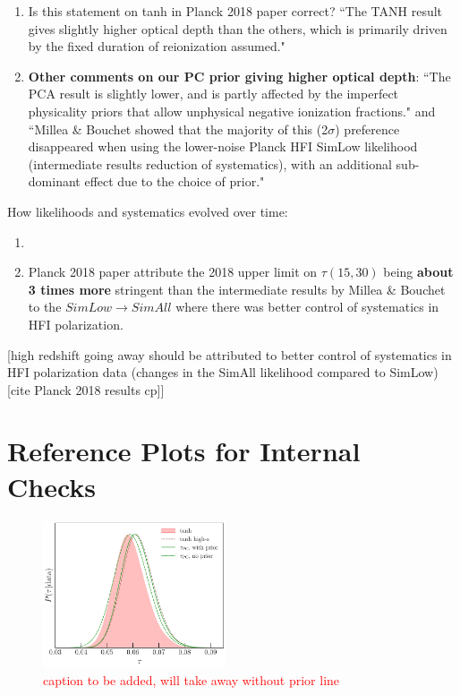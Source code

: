 \documentclass[prd,twocolumn,amsmath,amssymb,floatfix,superscriptaddress,nofootinbib]{revtex4-1}
\newcommand{\ch}[1]{\textcolor{red}{#1}}
\begin{document}
{\begin{enumerate}
    \item {Is this statement on tanh in Planck 2018 paper correct?} ``The TANH result gives slightly higher optical depth than the others, which is primarily driven by the fixed duration of reionization assumed." \\
    
    \item{\textbf{Other comments on our PC prior giving higher optical depth}: ``The PCA result is slightly lower, and is partly affected by the imperfect physicality priors that allow unphysical negative ionization fractions." and ``Millea \& Bouchet showed that the majority of this (2$\sigma$) preference disappeared when using the lower-noise Planck HFI SimLow likelihood (intermediate results reduction of systematics), with an additional sub-dominant effect due to the choice of prior."}
    
\end{enumerate}

How likelihoods and systematics evolved over time:

\begin{enumerate}
    \item 
    \item {Planck 2018 paper attribute the 2018 upper limit on $\tau(15, 30)$ being \textbf{about 3 times more} stringent than the intermediate results by Millea \& Bouchet to the $SimLow \rightarrow SimAll$ where there was better control of systematics in HFI polarization.}
\end{enumerate}


[high redshift going away should be attributed to better control of systematics in HFI polarization data (changes in the SimAll likelihood compared to SimLow) [cite Planck 2018 results cp]]

\section{Reference Plots for Internal Checks}

\begin{figure}
\includegraphics[width=0.48\textwidth]{results/tau_posterior_comparisons/pl18_tau_posterior_tanh_vs_tanh_highz_vs_pc_dz_auto_zre_prior_6p1_normalized_by_max.pdf}
\caption{\ch{caption to be added, will take away without prior line}}
\label{fig:tau_posterior_PC_vs_tanh_vs_tanh_highz}
\end{figure}

}
\end{document}
